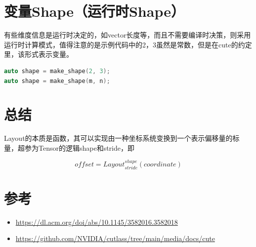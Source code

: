 \section{变量Shape（运行时Shape）}

有些维度信息是运行时决定的，如vector长度等，而且不需要编译时决策，则采用运行时计算模式，值得注意的是示例代码中的2，3虽然是常数，但是在cute的约定里，该形式表示变量。

\begin{lstlisting}[language=C++]
auto shape = make_shape(2, 3);
auto shape = make_shape(m, n);
\end{lstlisting}

\section{总结}

Layout的本质是函数，其可以实现由一种坐标系统变换到一个表示偏移量的标量，超参为Tensor的逻辑shape和stride，即

\begin{equation*}
offset = Layout^{shape}_{stride}(coordinate)
\end{equation*}

\section{参考}

\begin{itemize}
  \item \url{https://dl.acm.org/doi/abs/10.1145/3582016.3582018}
  \item \url{https://github.com/NVIDIA/cutlass/tree/main/media/docs/cute}
\end{itemize}
